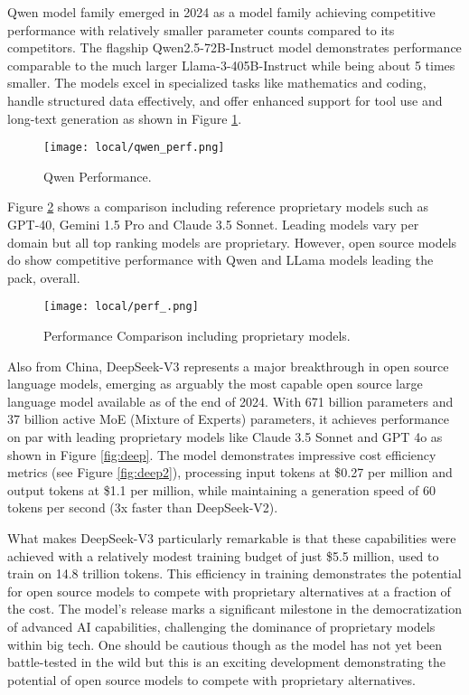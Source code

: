 Qwen model family \cite{qwen2024qwen25technicalreport} emerged in 2024 as a model family achieving competitive performance with relatively smaller parameter counts compared to its competitors. The flagship Qwen2.5-72B-Instruct model demonstrates performance comparable to the much larger Llama-3-405B-Instruct while being about 5 times smaller. The models excel in specialized tasks like mathematics and coding, handle structured data effectively, and offer enhanced support for tool use and long-text generation as shown in Figure \ref{fig:qwen_perf}.

\begin{figure}[H]
\centering
\texttt{[image: local/qwen\_perf.png]}
\caption{Qwen Performance.}
\label{fig:qwen_perf}
\end{figure}

Figure \ref{fig:perf_} shows a comparison including reference proprietary models such as GPT-40, Gemini 1.5 Pro and Claude 3.5 Sonnet. Leading models vary per domain but all top ranking models are proprietary. However, open source models do show competitive performance with Qwen and LLama models leading the pack, overall.

\begin{figure}[H]
\centering
\texttt{[image: local/perf\_.png]}
\caption{Performance Comparison including proprietary models.}
\label{fig:perf_}
\end{figure}

Also from China, DeepSeek-V3 \cite{deepseek2024v3} represents a major breakthrough in open source language models, emerging as arguably the most capable open source large language model available as of the end of 2024. With 671 billion parameters and 37 billion active MoE (Mixture of Experts) parameters, it achieves performance on par with leading proprietary models like Claude 3.5 Sonnet and GPT 4o as shown in Figure \ref{fig:deep}. The model demonstrates impressive cost efficiency metrics (see Figure \ref{fig:deep2}), processing input tokens at \$0.27 per million and output tokens at \$1.1 per million, while maintaining a generation speed of 60 tokens per second (3x faster than DeepSeek-V2).

What makes DeepSeek-V3 particularly remarkable is that these capabilities were achieved with a relatively modest training budget of just \$5.5 million, used to train on 14.8 trillion tokens. This efficiency in training demonstrates the potential for open source models to compete with proprietary alternatives at a fraction of the cost. The model's release marks a significant milestone in the democratization of advanced AI capabilities, challenging the dominance of proprietary models within big tech. One should be cautious though as the model has not yet been battle-tested in the wild but this is an exciting development demonstrating the potential of open source models to compete with proprietary alternatives.

